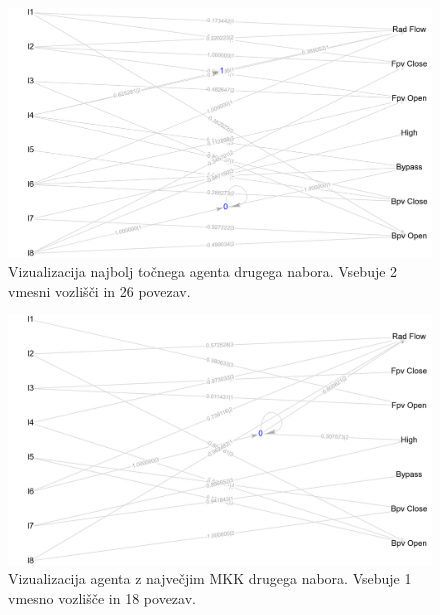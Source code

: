 \begin{figure}[H]
    \begin{center}
        \includegraphics[width=13cm]{shuttle/2/acc_g}
    \end{center}
    \caption{Vizualizacija najbolj točnega agenta drugega nabora. Vsebuje 2 vmesni vozlišči in 26 povezav.}
    \label{fig:statlog_acc_2_g}
\end{figure}

\begin{figure}[H]
    \begin{center}
        \includegraphics[width=13cm]{shuttle/2/mcc_g}
    \end{center}
    \caption{Vizualizacija agenta z največjim MKK drugega nabora. Vsebuje 1 vmesno vozlišče in 18 povezav.}
    \label{fig:statlog_mcc_2_g}
\end{figure}

